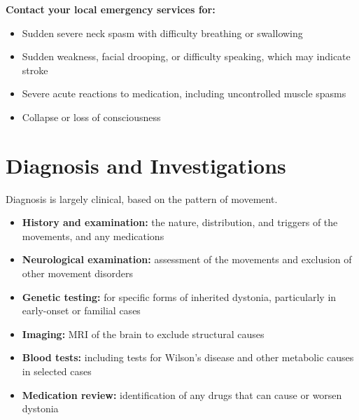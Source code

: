 \textbf{Contact your local emergency services for:}
\begin{itemize}
    \item Sudden severe neck spasm with difficulty breathing or swallowing
    \item Sudden weakness, facial drooping, or difficulty speaking, which may indicate stroke
    \item Severe acute reactions to medication, including uncontrolled muscle spasms
    \item Collapse or loss of consciousness
\end{itemize}

\section*{Diagnosis and Investigations}
Diagnosis is largely clinical, based on the pattern of movement.
\begin{itemize}
    \item \textbf{History and examination:} the nature, distribution, and triggers of the movements, and any medications
    \item \textbf{Neurological examination:} assessment of the movements and exclusion of other movement disorders
    \item \textbf{Genetic testing:} for specific forms of inherited dystonia, particularly in early-onset or familial cases
    \item \textbf{Imaging:} MRI of the brain to exclude structural causes
    \item \textbf{Blood tests:} including tests for Wilson's disease and other metabolic causes in selected cases
    \item \textbf{Medication review:} identification of any drugs that can cause or worsen dystonia
\end{itemize}

